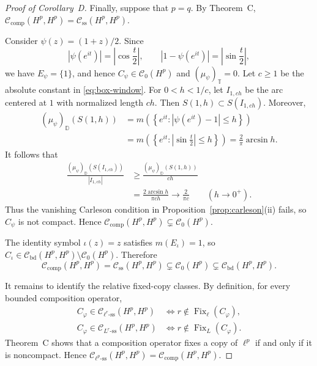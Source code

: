 \documentclass[11pt, reqno]{amsart}
\theoremstyle{definition}
\theoremstyle{remark}
\newcommand{\D}{\mathbb{D}}
\newcommand{\T}{\mathbb{T}}
\newcommand{\CB}{\mathcal C_{\mathrm{bd}}}
\newcommand{\CK}{\mathcal C_{\mathrm{comp}}}
\newcommand{\CS}{\mathcal C_{\mathrm{ss}}}
\newcommand{\CSell}[1]{\mathcal C_{\ell^{#1}\text{-ss}}}
\newcommand{\CSL}[1]{\mathcal C_{L^{#1}\text{-ss}}}
\begin{document}
\begin{proof}[Proof of Corollary~D]
Finally, suppose that \(p=q\). By Theorem~C,
\(\CK(H^p,H^p)=\CS(H^p,H^p)\).

Consider \(\psi(z)=(1+z)/2\). Since
\[
        |\psi(e^{it})|
        =
        \left|\cos\frac{t}{2}\right|,
        \qquad
        |1-\psi(e^{it})|
        =
        \left|\sin\frac{t}{2}\right|,
\]
we have \(E_\psi=\{1\}\), and hence
\(C_\psi\in\mathcal C_0(H^p)\) and \((\mu_\psi)_\T=0\).
Let \(c\ge1\) be the absolute constant in
\eqref{eq:box-window}. For \(0<h<1/c\), let
\(I_{1,ch}\) be the arc centered at \(1\) with normalized length
\(ch\). Then \(S(1,h)\subset S(I_{1,ch})\). Moreover,
\[
\begin{aligned}
        (\mu_\psi)_\D(S(1,h))
        &=
        m\left(
        \left\{
        e^{it}:
        \left|\psi(e^{it})-1\right|\le h
        \right\}
        \right)\\
        &=
        m\left(
        \left\{
        e^{it}:
        \left|\sin\frac{t}{2}\right|\le h
        \right\}
        \right)
        =
        \frac{2}{\pi}\arcsin h.
\end{aligned}
\]
It follows that
\[
\begin{aligned}
        \frac{(\mu_\psi)_\D(S(I_{1,ch}))}{|I_{1,ch}|}
        &\ge
        \frac{(\mu_\psi)_\D(S(1,h))}{ch}\\
        &=
        \frac{2\arcsin h}{\pi ch}
        \longrightarrow
        \frac{2}{\pi c}
        \qquad
        (h\to0^+).
\end{aligned}
\]
Thus the vanishing Carleson condition in
Proposition~\ref{prop:carleson}\textup{(ii)} fails, so
\(C_\psi\) is not compact. Hence
\(\CK(H^p,H^p)\subsetneq\mathcal C_0(H^p)\).

The identity symbol \(\iota(z)=z\) satisfies \(m(E_\iota)=1\), so
\(C_\iota\in\CB(H^p,H^p)\setminus\mathcal C_0(H^p)\). Therefore
\[
        \CK(H^p,H^p)
        =
        \CS(H^p,H^p)
        \subsetneq
        \mathcal C_0(H^p)
        \subsetneq
        \CB(H^p,H^p).
\]

It remains to identify the relative fixed-copy classes. By definition,
for every bounded composition operator,
\[
\begin{aligned}
        C_\varphi\in\CSell{r}(H^p,H^p)
        &\Longleftrightarrow
        r\notin\operatorname{Fix}_{\ell}(C_\varphi),\\
        C_\varphi\in\CSL{r}(H^p,H^p)
        &\Longleftrightarrow
        r\notin\operatorname{Fix}_{L}(C_\varphi).
\end{aligned}
\]
Theorem~C shows that a composition operator fixes a copy of
\(\ell^p\) if and only if it is noncompact. Hence
\(\CSell{p}(H^p,H^p)=\CK(H^p,H^p)\).


\end{proof}
\end{document}
